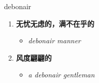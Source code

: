 
\begin{frame}
{\huge debonair}
\begin{center}
\begin{enumerate}\Large
  \item \textbf{无忧无虑的，满不在乎的}
  \begin{itemize}
    \item \em{\Large{debonair manner}}
  \end{itemize}
  \item \textbf{风度翩翩的}
  \begin{itemize}
    \item \em{\Large{a debonair gentleman}}
  \end{itemize}
\end{enumerate}
\end{center}
\end{frame}
